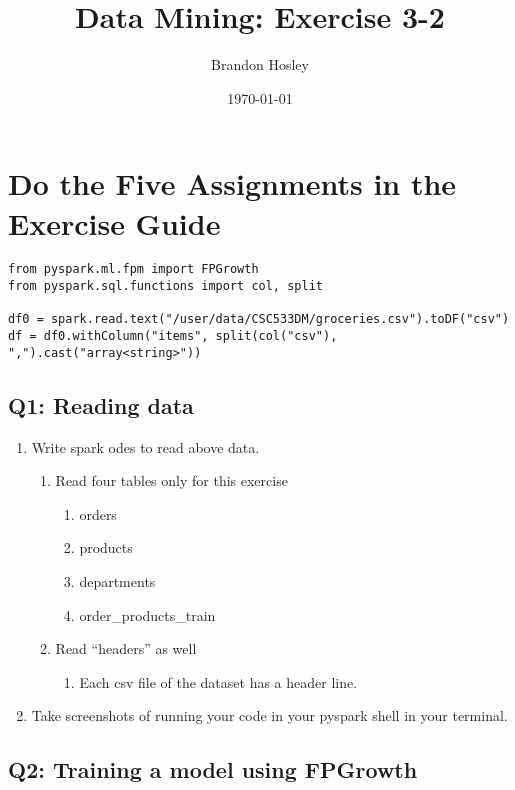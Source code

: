 \documentclass[]{article}
\title{Data Mining: Exercise 3-2}
\author{Brandon Hosley}
\date{\today}
\begin{document}
\maketitle

\section*{Do the Five Assignments in the Exercise Guide}

\begin{verbatim}
from pyspark.ml.fpm import FPGrowth
from pyspark.sql.functions import col, split

df0 = spark.read.text("/user/data/CSC533DM/groceries.csv").toDF("csv")
df = df0.withColumn("items", split(col("csv"), ",").cast("array<string>"))
\end{verbatim}

\subsection*{Q1: Reading data}
\begin{enumerate}[before=\itshape,label=\arabic*.]
	\item Write spark odes to read above data.
	\begin{enumerate}[before=\itshape,label=\alph*.]
		\item Read four tables only for this exercise
		\begin{enumerate}[before=\itshape,label=\roman*.]
			\item orders
			\item products
			\item departments
			\item order\_products\_train
		\end{enumerate}
		\item Read “headers” as well
		\begin{enumerate}[before=\itshape,label=\roman*.]
			\item Each csv file of the dataset has a header line.
		\end{enumerate}
	\end{enumerate}
	\item Take screenshots of running your code in your pyspark shell in your terminal.
\end{enumerate} 

\subsection*{Q2: Training a model using FPGrowth}
\end{document}
